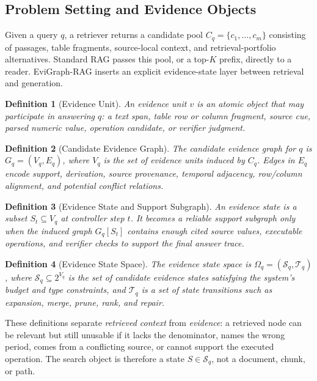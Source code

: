 \documentclass[letterpaper]{article}
\newtheorem{definition}{Definition}
\begin{document}
\subsection{Problem Setting and Evidence Objects}

Given a query \(q\), a retriever returns a candidate pool \(C_q=\{c_1,\ldots,c_m\}\) consisting of passages, table fragments, source-local context, and retrieval-portfolio alternatives.
Standard RAG passes this pool, or a top-\(K\) prefix, directly to a reader.
EviGraph-RAG inserts an explicit evidence-state layer between retrieval and generation.

\begin{definition}[Evidence Unit]
An evidence unit \(v\) is an atomic object that may participate in answering \(q\): a text span, table row or column fragment, source cue, parsed numeric value, operation candidate, or verifier judgment.
\end{definition}

\begin{definition}[Candidate Evidence Graph]
The candidate evidence graph for \(q\) is \(G_q=(V_q,E_q)\), where \(V_q\) is the set of evidence units induced by \(C_q\).
Edges in \(E_q\) encode support, derivation, source provenance, temporal adjacency, row/column alignment, and potential conflict relations.
\end{definition}

\begin{definition}[Evidence State and Support Subgraph]
An evidence state is a subset \(S_t\subseteq V_q\) at controller step \(t\).
It becomes a reliable support subgraph only when the induced graph \(G_q[S_t]\) contains enough cited source values, executable operations, and verifier checks to support the final answer trace.
\end{definition}

\begin{definition}[Evidence State Space]
The evidence state space is \(\Omega_q=(\mathcal{S}_q,\mathcal{T}_q)\), where \(\mathcal{S}_q\subseteq 2^{V_q}\) is the set of candidate evidence states satisfying the system's budget and type constraints, and \(\mathcal{T}_q\) is a set of state transitions such as expansion, merge, prune, rank, and repair.
\end{definition}

These definitions separate \emph{retrieved context} from \emph{evidence}: a retrieved node can be relevant but still unusable if it lacks the denominator, names the wrong period, comes from a conflicting source, or cannot support the executed operation.
The search object is therefore a state \(S\in\mathcal{S}_q\), not a document, chunk, or path.
\end{document}
